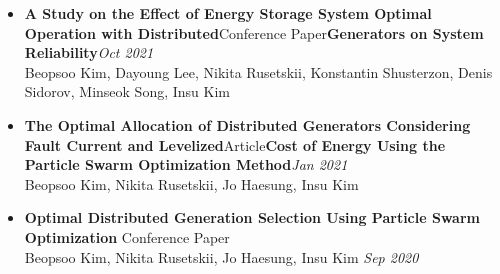 \documentclass[10pt]{article}
\begin{document}
\begin{itemize}[itemsep=5pt,topsep=0pt]
    \item \normalsize{\textbf{A Study on the Effect of Energy Storage System Optimal Operation with Distributed}\normalsize{\hfill Conference Paper}\newline\textbf{Generators on System Reliability}}\hfill \textit{Oct 2021}
    \\    \normalsize{Beopsoo Kim, Dayoung Lee, Nikita Rusetskii, Konstantin Shusterzon, Denis Sidorov, Minseok Song, Insu Kim}
    \item \normalsize{\textbf{The Optimal Allocation of Distributed Generators Considering Fault Current and Levelized}\normalsize{\hfill Article}\newline\textbf{Cost of Energy Using the Particle Swarm Optimization Method}}\hfill \textit{Jan 2021}
    \\    \normalsize{Beopsoo Kim, Nikita Rusetskii, Jo Haesung, Insu Kim}
    \item \normalsize{\textbf{Optimal Distributed Generation Selection Using Particle Swarm Optimization}} \normalsize{\hfill Conference Paper
    \\    \normalsize{Beopsoo Kim, Nikita Rusetskii, Jo Haesung, Insu Kim} \hfill \textit{Sep 2020}}
        \end{itemize}

\end{document}

